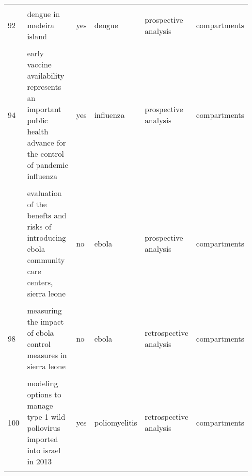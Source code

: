 \documentclass[
]{article}
\begin{document}
\begin{landscape}
\begin{longtable}{l>{\raggedright\arraybackslash}p{3.3cm}l>{\raggedright\arraybackslash}p{3.3cm}>{\raggedright\arraybackslash}p{2cm}l}
\addlinespace
\cellcolor{gray!6}{91} & \cellcolor{gray!6}{be-codis: a mathematical model to predict the risk of human diseases spread between countries—validation and application to the 2014–2015 ebola virus disease epidemic} & \cellcolor{gray!6}{not applicable} & \cellcolor{gray!6}{ebola} & \cellcolor{gray!6}{prospective analysis} & \cellcolor{gray!6}{compartments}\\
92 & dengue in madeira island & yes & dengue & prospective analysis & compartments\\
\cellcolor{gray!6}{93} & \cellcolor{gray!6}{dynamic simulation of a seiqr-v epidemic model based on cellular automata} & \cellcolor{gray!6}{no} & \cellcolor{gray!6}{influenza} & \cellcolor{gray!6}{prospective analysis} & \cellcolor{gray!6}{compartments}\\
94 & early vaccine availability represents an important public health advance for the control of pandemic influenza & yes & influenza & prospective analysis & compartments\\
\cellcolor{gray!6}{95} & \cellcolor{gray!6}{effectiveness of ebola treatment units and community care centers — liberia, september 23–october 31, 2014} & \cellcolor{gray!6}{no} & \cellcolor{gray!6}{ebola} & \cellcolor{gray!6}{retrospective analysis} & \cellcolor{gray!6}{compartments}\\
\addlinespace
96 & evaluation of the benefts and risks of introducing ebola community care centers, sierra leone & no & ebola & prospective analysis & compartments\\
\cellcolor{gray!6}{97} & \cellcolor{gray!6}{evidence for emergency vaccination having played a crucial role to control the 1965/66 foot-and-mouth disease outbreak in switzerland} & \cellcolor{gray!6}{yes} & \cellcolor{gray!6}{fmd} & \cellcolor{gray!6}{retrospective analysis} & \cellcolor{gray!6}{agents}\\
98 & measuring the impact of ebola control measures in sierra leone & no & ebola & retrospective analysis & compartments\\
\cellcolor{gray!6}{99} & \cellcolor{gray!6}{media impact switching surface during an infectious disease outbreak} & \cellcolor{gray!6}{yes} & \cellcolor{gray!6}{influenza} & \cellcolor{gray!6}{retrospective analysis} & \cellcolor{gray!6}{compartments}\\
100 & modeling options to manage type 1 wild poliovirus imported into israel in 2013 & yes & poliomyelitis & retrospective analysis & compartments\\
\addlinespace
\cellcolor{gray!6}{101} & \cellcolor{gray!6}{modeling the effect of comprehensive interventions on ebola virus transmission} & \cellcolor{gray!6}{no} & \cellcolor{gray!6}{ebola} & \cellcolor{gray!6}{prospective analysis} & \cellcolor{gray!6}{compartments}\\

\end{longtable}
\end{landscape}
\end{document}
